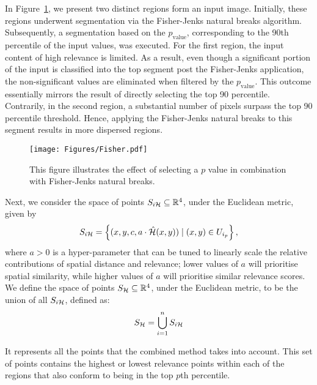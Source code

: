 In Figure~\ref{Fig:Fisher}, we present two distinct regions form an input image. Initially, these regions underwent segmentation via the Fisher-Jenks natural breaks algorithm. Subsequently, a segmentation based on the \( p_{\text{value}} \), corresponding to the 90th percentile of the input values, was executed. For the first region, the input content of high relevance is limited. As a result, even though a significant portion of the input is classified into the top segment post the Fisher-Jenks application, the non-significant values are eliminated when filtered by the \( p_{\text{value}} \). This outcome essentially mirrors the result of directly selecting the top 90 percentile. Contrarily, in the second region, a substantial number of pixels surpass the top 90 percentile threshold. Hence, applying the Fisher-Jenks natural breaks to this segment results in more dispersed regions.

\begin{figure}[ht!]
	\begin{center}
		\texttt{[image: Figures/Fisher.pdf]}
	\end{center}
	\caption{This figure illustrates the effect of selecting a \( p \) value in combination with Fisher-Jenks natural breaks.}
	\label{Fig:Fisher}
\end{figure}

Next, we consider the space of points \( S_{i\mathcal{H}} \subseteq \mathbb{R}^4 \), under the Euclidean metric, given by
\begin{equation*}
    S_{i\mathcal{H}} = \left\{ (x, y, c, a \cdot \hat{\mathcal{H}}(x, y)) \mid (x, y) \in U_{i_p} \right\},
\end{equation*}
where \( a > 0 \) is a hyper-parameter that can be tuned to linearly scale the relative contributions of spatial distance and relevance; lower values of \( a \) will prioritise spatial similarity, while higher values of \( a \) will prioritise similar relevance scores. We define the space of points \( S_{\mathcal{H}} \subseteq \mathbb{R}^4 \), under the Euclidean metric, to be the union of all \( S_{i\mathcal{H}} \), defined as:
\begin{equation}
    S_{\mathcal{H}} = \bigcup_{i=1}^{n} S_{i\mathcal{H}}
    \label{eq:set_of_points}
\end{equation}

It represents all the points that the combined method takes into account. This set of points contains the highest or lowest relevance points within each of the regions that also conform to being in the top \( p \)th percentile.

